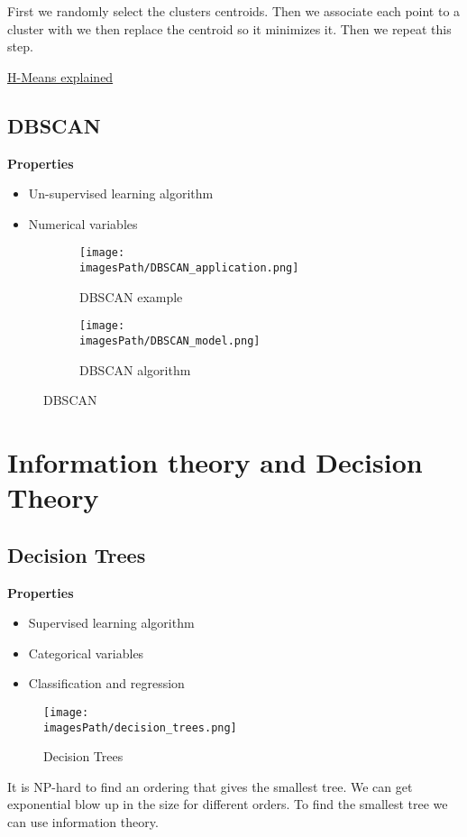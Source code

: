 First we randomly select the clusters centroids. Then we associate each 
point to a cluster with we then replace the centroid so it minimizes it.
Then we repeat this step.  

\href{https://www.youtube.com/watch?v=4b5d3muPQmA}{H-Means explained}

\subsection{DBSCAN}
\textbf{Properties}
\begin{itemize}
    \item Un-supervised learning algorithm
    \item Numerical variables 
\end{itemize}


\begin{figure}[!h]
     \centering
     \begin{subfigure}[b]{0.4\textwidth}
         \centering
         \texttt{[image: \\imagesPath/DBSCAN\_application.png]}
         \caption{DBSCAN example}
     \end{subfigure}
     \hfill
     \begin{subfigure}[b]{0.4\textwidth}
         \centering
         \texttt{[image: \\imagesPath/DBSCAN\_model.png]}
         \caption{DBSCAN algorithm}
     \end{subfigure}
    \caption{DBSCAN}
    \label{fig:DBSCAN}
\end{figure}



\section{Information theory and Decision Theory}
\subsection{Decision Trees}
\textbf{Properties}
\begin{itemize}
    \item Supervised learning algorithm
    \item Categorical variables 
    \item Classification and regression
\end{itemize}

\begin{figure}[!h]
    \centering
    \texttt{[image: \\imagesPath/decision\_trees.png]}
    \caption{Decision Trees}
\end{figure}
It is NP-hard to find an ordering that gives the smallest tree.
We can get exponential blow up in the size for different orders.
To find the smallest tree we can use information theory.

